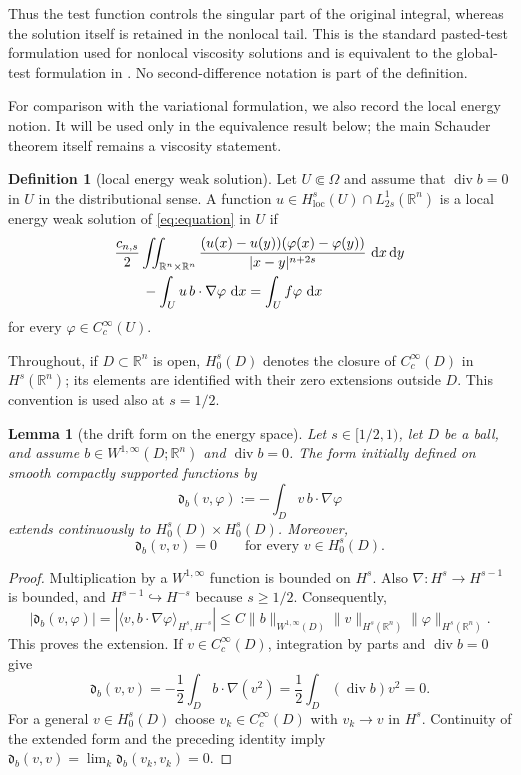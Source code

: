 \documentclass[reqno]{amsart}
\numberwithin{equation}{section}
\theoremstyle{plain}
\newtheorem{lemma}[theorem]{Lemma}
\theoremstyle{definition}
\newtheorem{definition}[theorem]{Definition}
\theoremstyle{remark}
\newcommand{\R}{\mathbb R}
\newcommand{\differential}{\mathop{}\!\mathrm d}
\DeclareMathOperator{\divergence}{div}
\begin{document}
Thus the test function controls the singular part of the original integral,
whereas the solution itself is retained in the nonlocal tail.  This is the
standard pasted-test formulation used for nonlocal viscosity solutions and
is equivalent to the global-test formulation in
\cite[Section~3]{Silvestre2012Diff}.  No second-difference notation is part
of the definition.

For comparison with the variational formulation, we also record the local
energy notion.  It will be used only in the equivalence result below; the
main Schauder theorem itself remains a viscosity statement.

\begin{definition}[local energy weak solution]\label{def:weak}
Let $U\Subset\Omega$ and assume that $\divergence b=0$ in $U$ in the
distributional sense.  A function
$u\in H^{s}_{\mathrm{loc}}(U)\cap L^1_{2s}(\R^n)$ is a local energy weak
solution of \eqref{eq:equation} in $U$ if
\begin{align}\label{eq:weak-form}
 &\frac{c_{n,s}}2\iint_{\R^n\times\R^n}
 \frac{(u(x)-u(y))(\varphi(x)-\varphi(y))}{|x-y|^{n+2s}}
 \,\differential x\differential y\notag\\
 &\qquad-\int_U u\,b\cdot\nabla\varphi\,\differential x
 =\int_U f\varphi\,\differential x
\end{align}
for every $\varphi\in C_c^\infty(U)$.
\end{definition}

Throughout, if $D\subset\R^n$ is open, $H_0^s(D)$ denotes the closure of
$C_c^\infty(D)$ in $H^s(\R^n)$; its elements are identified with their zero
extensions outside $D$.  This convention is used also at $s=1/2$.

\begin{lemma}[the drift form on the energy space]
\label{lem:drift-form}
Let $s\in[1/2,1)$, let $D$ be a ball, and assume
$b\in W^{1,\infty}(D;\R^n)$ and $\divergence b=0$.  The form initially
defined on smooth compactly supported functions by
\[
 \mathfrak d_b(v,\varphi):=-\int_D v\,b\cdot\nabla\varphi
\]
extends continuously to $H_0^s(D)\times H_0^s(D)$.  Moreover,
\begin{equation}\label{eq:drift-cancellation}
 \mathfrak d_b(v,v)=0\qquad\text{for every }v\in H_0^s(D).
\end{equation}
\end{lemma}

\begin{proof}
Multiplication by a $W^{1,\infty}$ function is bounded on $H^s$.  Also
$\nabla:H^s\to H^{s-1}$ is bounded, and $H^{s-1}\hookrightarrow H^{-s}$
because $s\ge1/2$.  Consequently,
\[
 |\mathfrak d_b(v,\varphi)|
 =|\langle v,b\cdot\nabla\varphi\rangle_{H^s,H^{-s}}|
 \le C\|b\|_{W^{1,\infty}(D)}
       \|v\|_{H^s(\R^n)}\|\varphi\|_{H^s(\R^n)}.
\]
This proves the extension.  If $v\in C_c^\infty(D)$, integration by parts
and $\divergence b=0$ give
\[
 \mathfrak d_b(v,v)=-\frac12\int_D b\cdot\nabla(v^2)
 =\frac12\int_D(\divergence b)v^2=0.
\]
For a general $v\in H_0^s(D)$ choose $v_k\in C_c^\infty(D)$ with
$v_k\to v$ in $H^s$.  Continuity of the extended form and the preceding
identity imply
$\mathfrak d_b(v,v)=\lim_k\mathfrak d_b(v_k,v_k)=0$.
\end{proof}
\end{document}
